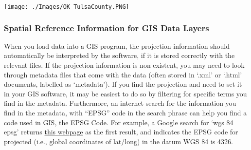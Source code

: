 \documentclass[12pt,]{article}
\begin{document}
\texttt{[image: ./Images/OK\_TulsaCounty.PNG]}\\

\subsubsection{Spatial Reference Information for GIS Data
Layers}\label{spatial-reference-information-for-gis-data-layers}

When you load data into a GIS program, the projection information should
automatically be interpreted by the software, if it is stored correctly
with the relevant files. If the projection information is non-existent,
you may need to look through metadata files that come with the data
(often stored in `.xml' or `.html' documents, labelled as `metadata').
If you find the projection and need to set it in your GIS software, it
may be easiest to do so by filtering for specific terms you find in the
metadata. Furthermore, an internet search for the information you find
in the metadata, with ``EPSG'' code in the search phrase can help you
find a code used in GIS, the EPSG Code. For example, a Google search for
`wgs 84 epsg' returns
\href{http://spatialreference.org/ref/epsg/wgs-84/}{this webpage} as the
first result, and indicates the EPSG code for projected (i.e., global
coordinates of lat/long) in the datum WGS 84 is 4326.
\end{document}
